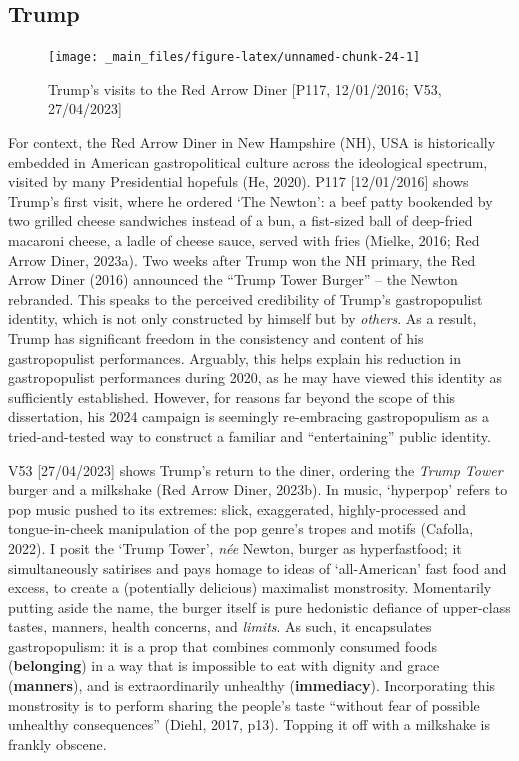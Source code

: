 \documentclass[a4paper, nobind]{templates/ociamthesis}
\begin{document}
\hypertarget{trump-3}{%
\subsection*{Trump}\label{trump-3}}

\begin{figure}
\texttt{[image: \_main\_files/figure-latex/unnamed-chunk-24-1]} \caption{Trump's visits to the Red Arrow Diner [P117, 12/01/2016; V53, 27/04/2023]}\label{fig:unnamed-chunk-24}
\end{figure}

For context, the Red Arrow Diner in New Hampshire (NH), USA is historically embedded in American gastropolitical culture across the ideological spectrum, visited by many Presidential hopefuls (He, 2020). P117 {[}12/01/2016{]} shows Trump's first visit, where he ordered `The Newton': a beef patty bookended by two grilled cheese sandwiches instead of a bun, a fist-sized ball of deep-fried macaroni cheese, a ladle of cheese sauce, served with fries (Mielke, 2016; Red Arrow Diner, 2023a).
Two weeks after Trump won the NH primary, the Red Arrow Diner (2016) announced the ``Trump Tower Burger'' -- the Newton rebranded. This speaks to the perceived credibility of Trump's gastropopulist identity, which is not only constructed by himself but by \emph{others}. As a result, Trump has significant freedom in the consistency and content of his gastropopulist performances. Arguably, this helps explain his reduction in gastropopulist performances during 2020, as he may have viewed this identity as sufficiently established. However, for reasons far beyond the scope of this dissertation, his 2024 campaign is seemingly re-embracing gastropopulism as a tried-and-tested way to construct a familiar and ``entertaining'' public identity.

V53 {[}27/04/2023{]} shows Trump's return to the diner, ordering the \emph{Trump Tower} burger and a milkshake (Red Arrow Diner, 2023b). In music, `hyperpop' refers to pop music pushed to its extremes: slick, exaggerated, highly-processed and tongue-in-cheek manipulation of the pop genre's tropes and motifs (Cafolla, 2022). I posit the `Trump Tower', \emph{née} Newton, burger as hyperfastfood; it simultaneously satirises and pays homage to ideas of `all-American' fast food and excess, to create a (potentially delicious) maximalist monstrosity. Momentarily putting aside the name, the burger itself is pure hedonistic defiance of upper-class tastes, manners, health concerns, and \emph{limits}. As such, it encapsulates gastropopulism: it is a prop that combines commonly consumed foods (\textbf{belonging}) in a way that is impossible to eat with dignity and grace (\textbf{manners}), and is extraordinarily unhealthy (\textbf{immediacy}). Incorporating this monstrosity is to perform sharing the people's taste ``without fear of possible unhealthy consequences'' (Diehl, 2017, p13). Topping it off with a milkshake is frankly obscene.
\end{document}
